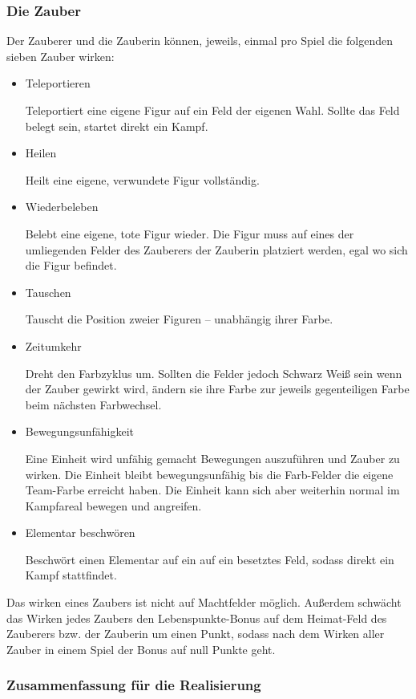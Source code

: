 \subsubsection{Die Zauber}
Der Zauberer und die Zauberin können, jeweils, einmal pro Spiel die folgenden sieben Zauber wirken:
\begin{itemize}
	\item Teleportieren
	
	Teleportiert eine eigene Figur auf ein Feld der eigenen Wahl. Sollte das Feld belegt sein, startet direkt ein Kampf.
	\item Heilen

	Heilt eine eigene, verwundete Figur vollständig.
	\item Wiederbeleben

	Belebt eine eigene, tote Figur wieder. Die Figur muss auf eines der umliegenden Felder des Zauberers \bzw der Zauberin platziert werden, egal wo sich die Figur befindet.
	\item Tauschen

	Tauscht die Position zweier Figuren -- unabhängig ihrer Farbe.
	\item Zeitumkehr

	Dreht den Farbzyklus um. Sollten die Felder jedoch Schwarz \bzw Weiß sein wenn der Zauber gewirkt wird, ändern sie ihre Farbe zur jeweils gegenteiligen Farbe beim nächsten Farbwechsel.
	\item Bewegungsunfähigkeit

	Eine Einheit wird unfähig gemacht Bewegungen auszuführen und Zauber zu wirken. Die Einheit bleibt bewegungsunfähig bis die Farb-Felder die eigene Team-Farbe erreicht haben. Die Einheit kann sich aber weiterhin normal im Kampfareal bewegen und angreifen.
	\item Elementar beschwören

	Beschwört einen Elementar auf ein auf ein besetztes Feld, sodass direkt ein Kampf stattfindet.
\end{itemize}
Das wirken eines Zaubers ist nicht auf Machtfelder möglich. Außerdem schwächt das Wirken jedes Zaubers den Lebenspunkte-Bonus auf dem Heimat-Feld des Zauberers bzw. der Zauberin um einen Punkt, sodass nach dem Wirken aller Zauber in einem Spiel der Bonus auf null Punkte geht.

\subsubsection{Zusammenfassung für die Realisierung}

